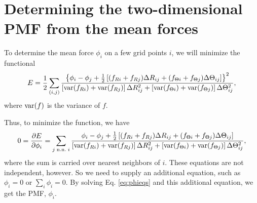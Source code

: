 \documentclass{article}
\begin{document}
\section{Determining the two-dimensional PMF from the mean forces}


To determine the mean force $\phi_i$ on a few grid points $i$,
we will minimize the functional
$$
E
=
\frac 1 2
\sum_{(i, j)}
\frac{
  \left\{
  \phi_i - \phi_j
  +
  \frac 1 2
  \left[
    (f_{Ri} + f_{Rj}) \Delta R_{ij}
       + (f_{\Theta i} + f_{\Theta j}) \Delta \Theta_{ij}
  \right]
  \right\}^2
}
{
  [\mathrm{var} (f_{Ri}) + \mathrm{var} (f_{Rj}) ] \, \Delta R_{ij}^2
  +
  [\mathrm{var} (f_{\Theta i}) + \mathrm{var} (f_{\Theta j}) ] \, \Delta \Theta_{ij}^2
}
,
$$
where
$\mathrm{var} (f)$
is the variance of $f$.

Thus, to minimize the function, we have
\begin{equation}
0
=
\frac{ \partial E } { \partial \phi_i }
=
\sum_{j \mathrm{\; n.n. \; } i }
\frac{
  \phi_i - \phi_j
  +
  \frac 1 2
  \left[
    (f_{Ri} + f_{Rj}) \Delta R_{ij}
       + (f_{\Theta i} + f_{\Theta j}) \Delta \Theta_{ij}
  \right]
}
{
  [\mathrm{var} (f_{Ri}) + \mathrm{var} (f_{Rj}) ] \, \Delta R_{ij}^2
  +
  [\mathrm{var} (f_{\Theta i}) + \mathrm{var} (f_{\Theta j}) ] \, \Delta \Theta_{ij}^2
}
,
\label{eq:phieqs}
\end{equation}
where the sum is carried over nearest neighbors of $i$.
These equations are not independent, however.
%
So we need to supply an additional equation,
such as $\phi_i = 0$ or $\sum_i \phi_i = 0$.
%
By solving Eq. \eqref{eq:phieqs} and this additional equation,
we get the PMF, $\phi_i$.

%
%
\end{document}
